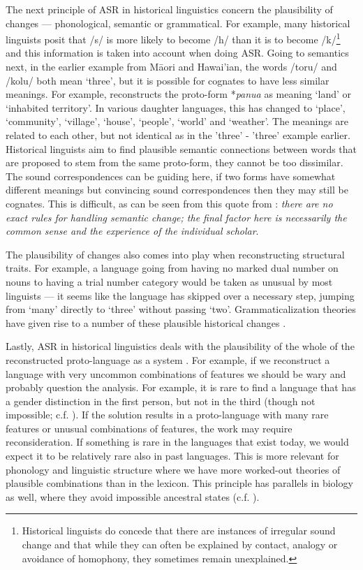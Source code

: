 \documentclass[12pt,letterpaper]{article}
\begin{document}
The next principle of ASR in historical linguistics concern the plausibility of changes --- phonological, semantic or grammatical. For example, many historical linguists posit that /s/ is more likely to become /h/ than it is to become /k/\footnote{Historical linguists do concede that there are instances of irregular sound change \citep{blust1996neogrammarian, campbell1996sound} and that while they can often be explained by contact, analogy or avoidance of homophony, they sometimes remain unexplained.} and this information is taken into account when doing ASR. Going to semantics next, in the earlier example from M\={a}ori and Hawai'ian, the words /toru/ and /kolu/ both mean `three', but it is possible for cognates to have less similar meanings. For example, \citet{pawley2005meaning} reconstructs the proto-form *\emph{panua} as meaning `land' or `inhabited territory'. In various daughter languages, this has changed to `place', `community', `village', `house', `people', `world' and `weather'. The meanings are related to each other, but not identical as in the 'three' - 'three' example earlier. Historical linguists aim to find plausible semantic connections between words that are proposed to stem from the same proto-form, they cannot be too dissimilar. The sound correspondences can be guiding here, if two forms have somewhat different meanings but convincing sound correspondences then they may still be cognates. This is difficult, as can be seen from this quote from \citet[229]{anttila1989historical}: \emph{there are no exact rules for handling semantic change; the final factor here is necessarily the common sense and the experience of the individual scholar}. 

The plausibility of changes also comes into play when reconstructing structural traits. For example, a language going from having no marked dual number on nouns to having a trial number category would be taken as unusual by most linguists \citep[c.f.][8]{kikusawa_2006_pro_number} --- it seems like the language has skipped over a necessary step, jumping from `many' directly to `three' without passing `two'. Grammaticalization theories have given rise to a number of these plausible historical changes \citep[594-5, 598]{heine2003grammaticalization}.

Lastly, ASR in historical linguistics deals with the plausibility of the whole of the reconstructed proto-language as a system \citep[1]{clark1973aspects}. For example, if we reconstruct a language with very uncommon combinations of features we should be wary and probably question the analysis. For example, it is rare to find a language that has a gender distinction in the first person, but not in the third (though not impossible; c.f. \citet{wals-44}). If the solution results in a proto-language with many rare features or unusual combinations of features, the work may require reconsideration. If something is rare in the languages that exist today, we would expect it to be relatively rare also in past languages. This is more relevant for phonology and linguistic structure where we have more worked-out theories of plausible combinations than in the lexicon. This principle has parallels in biology as well, where they avoid impossible ancestral states (c.f. \citep{schulmeister2004comparative}).
\end{document}
